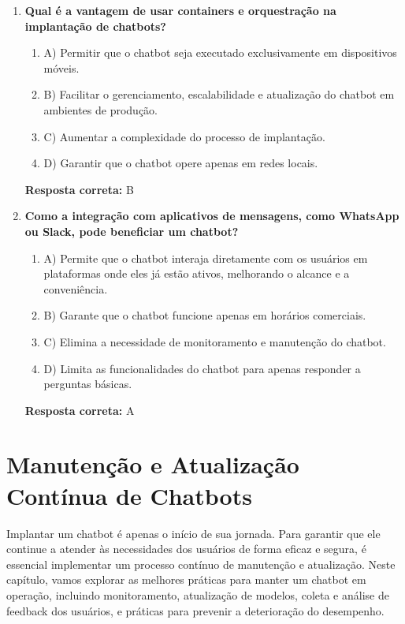 \documentclass[14pt,a4paper,oneside]{book}
\begin{document}
\begin{enumerate}
	\item \textbf{Qual é a vantagem de usar containers e orquestração na implantação de chatbots?}
	\begin{enumerate}[label=\alph*)]
		\item A) Permitir que o chatbot seja executado exclusivamente em dispositivos móveis.
		\item B) Facilitar o gerenciamento, escalabilidade e atualização do chatbot em ambientes de produção.
		\item C) Aumentar a complexidade do processo de implantação.
		\item D) Garantir que o chatbot opere apenas em redes locais.
	\end{enumerate}
	\vspace{5mm}
	\textbf{Resposta correta:} B
	
	\item \textbf{Como a integração com aplicativos de mensagens, como WhatsApp ou Slack, pode beneficiar um chatbot?}
	\begin{enumerate}[label=\alph*)]
		\item A) Permite que o chatbot interaja diretamente com os usuários em plataformas onde eles já estão ativos, melhorando o alcance e a conveniência.
		\item B) Garante que o chatbot funcione apenas em horários comerciais.
		\item C) Elimina a necessidade de monitoramento e manutenção do chatbot.
		\item D) Limita as funcionalidades do chatbot para apenas responder a perguntas básicas.
	\end{enumerate}
	\vspace{5mm}
	\textbf{Resposta correta:} A
	
\end{enumerate}


\chapter{Manutenção e Atualização Contínua de Chatbots}

Implantar um chatbot é apenas o início de sua jornada. Para garantir que ele continue a atender às necessidades dos usuários de forma eficaz e segura, é essencial implementar um processo contínuo de manutenção e atualização. Neste capítulo, vamos explorar as melhores práticas para manter um chatbot em operação, incluindo monitoramento, atualização de modelos, coleta e análise de feedback dos usuários, e práticas para prevenir a deterioração do desempenho.
\end{document}
